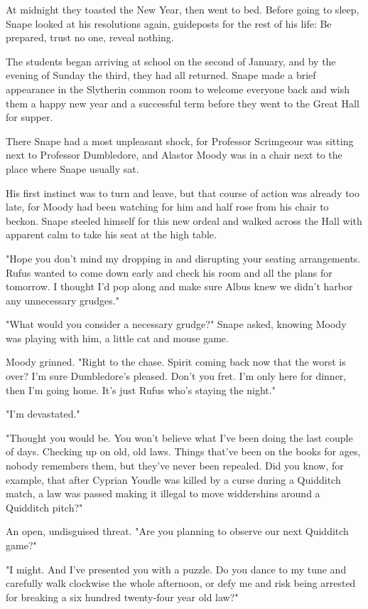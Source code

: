 \documentclass[a4paper,11pt]{article}
\begin{document}
At midnight they toasted the New Year, then went to bed. Before going to sleep, Snape looked at his resolutions again, guideposts for the rest of his life: Be prepared, trust no one, reveal nothing.

The students began arriving at school on the second of January, and by the evening of Sunday the third, they had all returned. Snape made a brief appearance in the Slytherin common room to welcome everyone back and wish them a happy new year and a successful term before they went to the Great Hall for supper.

There Snape had a most unpleasant shock, for Professor Scrimgeour was sitting next to Professor Dumbledore, and Alastor Moody was in a chair next to the place where Snape usually sat.

His first instinct was to turn and leave, but that course of action was already too late, for Moody had been watching for him and half rose from his chair to beckon. Snape steeled himself for this new ordeal and walked across the Hall with apparent calm to take his seat at the high table.

"Hope you don't mind my dropping in and disrupting your seating arrangements. Rufus wanted to come down early and check his room and all the plans for tomorrow. I thought I'd pop along and make sure Albus knew we didn't harbor any unnecessary grudges."

"What would you consider a necessary grudge?" Snape asked, knowing Moody was playing with him, a little cat and mouse game.

Moody grinned. "Right to the chase. Spirit coming back now that the worst is over? I'm sure Dumbledore's pleased. Don't you fret. I'm only here for dinner, then I'm going home. It's just Rufus who's staying the night."

"I'm devastated."

"Thought you would be. You won't believe what I've been doing the last couple of days. Checking up on old, old laws. Things that've been on the books for ages, nobody remembers them, but they've never been repealed. Did you know, for example, that after Cyprian Youdle was killed by a curse during a Quidditch match, a law was passed making it illegal to move widdershins around a Quidditch pitch?"

An open, undisguised threat. "Are you planning to observe our next Quidditch game?"

"I might. And I've presented you with a puzzle. Do you dance to my tune and carefully walk clockwise the whole afternoon, or defy me and risk being arrested for breaking a six hundred twenty-four year old law?"
\end{document}
